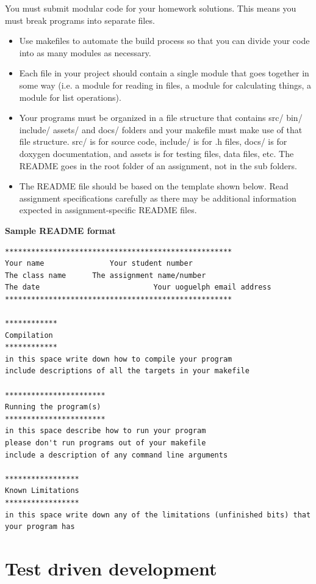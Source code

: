 You must submit modular code for your homework solutions.  This means you must break programs into separate files.   
\begin{itemize}
\item Use makefiles to automate the build process so that you can divide your code into as many modules as necessary.    
\item Each file in your project should contain a single module that goes together in some way (i.e. a module for reading in files,  a module for calculating things,  a module for list operations).
\item Your programs must be organized in a file structure that contains src/  bin/ include/  assets/  and docs/  folders and your makefile must make use of that file structure.   src/ is for source code,  include/ is for .h files,   docs/ is for doxygen documentation,  and assets is for testing files, data files, etc.   The README goes in the root folder of an assignment, not in the sub folders.
\item The README file should be based on the template shown below.  Read assignment specifications carefully as there may be additional information  expected in assignment-specific README files.
\end{itemize}

\clearpage
\textbf{Sample README format}
\begin{verbatim}
****************************************************
Your name		        Your student number
The class name		The assignment name/number
The date                          Your uoguelph email address
****************************************************

************
Compilation
************
in this space write down how to compile your program
include descriptions of all the targets in your makefile

***********************
Running the program(s)
***********************
in this space describe how to run your program
please don't run programs out of your makefile
include a description of any command line arguments

*****************
Known Limitations
*****************
in this space write down any of the limitations (unfinished bits) that your program has
\end{verbatim}

\section{Test driven development }

